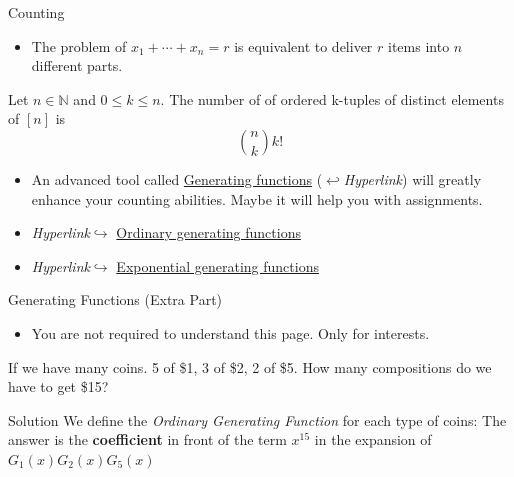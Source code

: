 \begin{frame}{Counting}
    \begin{itemize}
        \item The problem of $x_1+\cdots+x_n=r$ is equivalent to deliver $r$ items into $n$ different parts.
    \end{itemize}
    \begin{theorem}
        Let $n\in \mathbb{N}$ and $0\leq k\leq n$. The number of of ordered k-tuples of distinct elements of $[n]$ is $$\binom{n}{k}k!$$
    \end{theorem}
    \begin{itemize}
        \item An advanced tool called \href{https://www.cnblogs.com/dolphin0520/archive/2012/11/07/2755080.html}{Generating functions} ($\hookleftarrow$\emph{Hyperlink}) will greatly enhance your counting abilities. Maybe it will help you with assignments.
        \item \emph{Hyperlink}$\hookrightarrow$ \href{https://ocw.mit.edu/courses/electrical-engineering-and-computer-science/6-042j-mathematics-for-computer-science-fall-2010/readings/MIT6\_042JF10\_chap12.pdf}{Ordinary generating functions}
        \item \emph{Hyperlink}$\hookrightarrow$ \href{http://www.math.ualberta.ca/~xinweiyu/421.Q1.17w/421Q1Winter2017\_L15\_20170213.pdf}{Exponential generating functions}
    \end{itemize}
\end{frame}

\begin{frame}{Generating Functions (Extra Part)}
    \begin{itemize}
        \item You are not required to understand this page. Only for interests.
    \end{itemize}
    \begin{example}
        If we have many coins. 5 of \$1, 3 of \$2, 2 of \$5. How many compositions do we have to get \$15?
    \end{example}
    \begin{block}{Solution}
        We define the \emph{Ordinary Generating Function} for each type of coins: 
        The answer is the \textbf{coefficient} in front of the term $x^{15}$ in the expansion of $G_1(x)G_2(x)G_5(x)$
    \end{block}
\end{frame}

